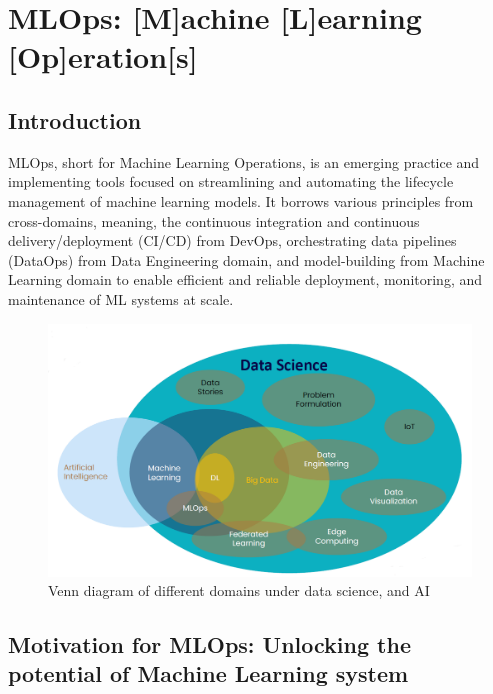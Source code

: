 \documentclass[
  letterpaper,
  DIV=11,
  numbers=noendperiod]{scrartcl}
\author{}
\date{}
\begin{document}
\section{\texorpdfstring{{\textbf{MLOps}}: {[}{\textbf{M}}{]}achine
{[}{\textbf{L}}{]}earning
{[}{\textbf{Op}}{]}eration{[}{\textbf{s}}{]}}{MLOps: {[}M{]}achine {[}L{]}earning {[}Op{]}eration{[}s{]}}}\label{mlops-machine-learning-operations}

\subsection{Introduction}\label{introduction}

MLOps, short for Machine Learning Operations, is an emerging practice
and implementing tools focused on streamlining and automating the
lifecycle management of machine learning models. It borrows various
principles from cross-domains, meaning, the continuous integration and
continuous delivery/deployment (CI/CD) from DevOps, orchestrating data
pipelines (DataOps) from Data Engineering domain, and model-building
from Machine Learning domain to enable efficient and reliable
deployment, monitoring, and maintenance of ML systems at scale.

\begin{figure}[H]

{\centering \includegraphics{Introduction to MLOps_files/mediabag/Venn_diagram.png}

}

\caption{Venn diagram of different domains under data science, and AI}

\end{figure}%

\subsection{Motivation for MLOps: Unlocking the potential of Machine
Learning
system}\label{motivation-for-mlops-unlocking-the-potential-of-machine-learning-system}
\end{document}
